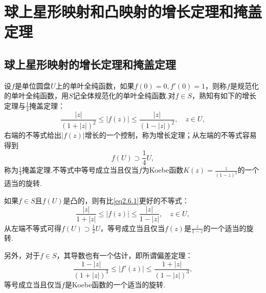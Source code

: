 \section{球上星形映射和凸映射的增长定理和掩盖定理\label{sec2.6}}
\subsection{球上星形映射的增长定理和掩盖定理}
设$f$是单位圆盘$U$上的单叶全纯函数，如果$f(0)=0,f'(0)=1$，则称$f$是规范化的单叶全纯函数，用$S$记全体规范化的单叶全纯函数.对$f\in S$，熟知有如下的增长定理与$\frac14$掩盖定理：
\begin{equation}\label{eq2.6.1}
	\frac{|z|}{(1+|z|)^2}\le|f(z)|\le\frac{|z|}{(1-|z|)^2},\quad z\in U,
\end{equation}
右端的不等式给出$|f(z)|$增长的一个控制，称为增长定理；从左端的不等式容易得到
\[f(U)\supset\frac14 U,\]
称为$\frac14$掩盖定理.不等式中等号成立当且仅当$f$为Koebe函数$K(z)=\frac{z}{(1-z)^2}$的一个适当的旋转.

如果$f\in S$且$f(U)$是凸的，则有比\eqref{eq2.6.1}更好的不等式：
\begin{equation}\label{eq2.6.2}
\frac{|z|}{1+|z|}\le|f(z)|\le\frac{|z|}{1-|z|},\quad z\in U,	
\end{equation}
从左端不等式可得$f(U)\supset\frac12 U$，等号成立当且仅当$f(z)$是$\frac{z}{1-z}$的一个适当的旋转.

另外，对于$f\in S$，其导数也有一个估计，即所谓偏差定理：
\begin{equation}\label{eq2.6.3}
	\frac{1-|z|}{(1+|z|)^3}\le|f'(z)|\le\frac{1+|z|}{(1-|z|)^3},
\end{equation}
等号成立当且仅当$f$是Koebe函数的一个适当的旋转.

